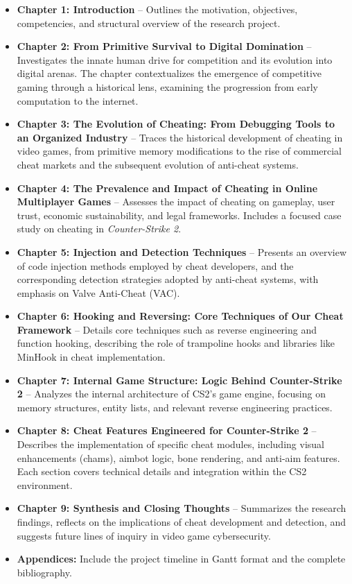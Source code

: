 \begin{itemize}
    \item \textbf{Chapter 1: Introduction} – Outlines the motivation, objectives, competencies, and structural overview of the research project.

    \item \textbf{Chapter 2: From Primitive Survival to Digital Domination} – Investigates the innate human drive for competition and its evolution into digital arenas. The chapter contextualizes the emergence of competitive gaming through a historical lens, examining the progression from early computation to the internet.

    \item \textbf{Chapter 3: The Evolution of Cheating: From Debugging Tools to an Organized Industry} – Traces the historical development of cheating in video games, from primitive memory modifications to the rise of commercial cheat markets and the subsequent evolution of anti-cheat systems.

    \item \textbf{Chapter 4: The Prevalence and Impact of Cheating in Online Multiplayer Games} – Assesses the impact of cheating on gameplay, user trust, economic sustainability, and legal frameworks. Includes a focused case study on cheating in \textit{Counter-Strike 2}.

    \item \textbf{Chapter 5: Injection and Detection Techniques} – Presents an overview of code injection methods employed by cheat developers, and the corresponding detection strategies adopted by anti-cheat systems, with emphasis on Valve Anti-Cheat (VAC).

    \item \textbf{Chapter 6: Hooking and Reversing: Core Techniques of Our Cheat Framework} – Details core techniques such as reverse engineering and function hooking, describing the role of trampoline hooks and libraries like MinHook in cheat implementation.

    \item \textbf{Chapter 7: Internal Game Structure: Logic Behind Counter-Strike 2} – Analyzes the internal architecture of CS2’s game engine, focusing on memory structures, entity lists, and relevant reverse engineering practices.

    \item \textbf{Chapter 8: Cheat Features Engineered for Counter-Strike 2} – Describes the implementation of specific cheat modules, including visual enhancements (chams), aimbot logic, bone rendering, and anti-aim features. Each section covers technical details and integration within the CS2 environment.

    \item \textbf{Chapter 9: Synthesis and Closing Thoughts} – Summarizes the research findings, reflects on the implications of cheat development and detection, and suggests future lines of inquiry in video game cybersecurity.

    \item \textbf{Appendices:} Include the project timeline in Gantt format and the complete bibliography.
\end{itemize}